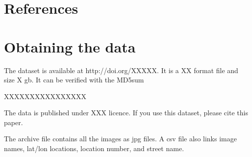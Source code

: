 \documentclass[final,3p,times,authoryear]{elsarticle}
\begin{document}
\section*{References}\label{sec:ref}
   
  


\begin{thebibliography}{00}


\bibitem[ ()]{}

\end{thebibliography}


\appendix
\setcounter{table}{0}
\renewcommand{\thetable}{A\arabic{table}}

\section{Obtaining the data}                           
The dataset is available at http://doi.org/XXXXX. It is a XX format file and size X gb. It can be verified with the MD5sum

XXXXXXXXXXXXXXXX

The data is published under XXX licence. If you use this dataset, please cite this paper.

The archive file contains all the images as jpg files. A csv file also links image names, lat/lon locations, location number, and street name.
\end{document}
